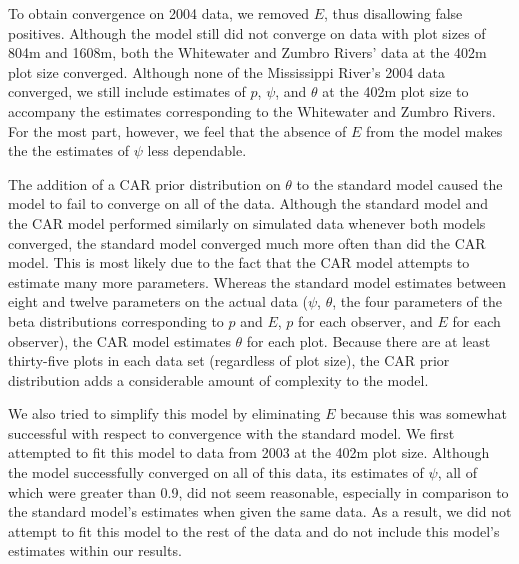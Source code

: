 \documentclass[12pt]{article}
\begin{document}
    To obtain convergence on 2004 data, we removed \(E\), thus disallowing false
    positives. Although the model still did not
    converge on data with plot sizes of 804m and 1608m, both the Whitewater and
    Zumbro Rivers' data at the 402m plot size converged. Although none of the
    Mississippi River's 2004 data converged, we still include estimates of
    \(p\), \(\psi\), and \(\theta\) at the 402m plot size to accompany the
    estimates corresponding to the Whitewater and Zumbro Rivers. For the most
    part, however, we feel that the absence of \(E\) from the model makes the
    the estimates of \(\psi\) less dependable.

    The addition of a CAR prior distribution on \(\theta\) to the standard model
    caused the model to fail to converge on all of the data. Although the
    standard model and the CAR model performed similarly on simulated data
    whenever both models converged, the standard model converged much more often
    than did the CAR model. This is most likely due to the fact that the CAR
    model attempts to estimate many more parameters. Whereas the standard model
    estimates between eight and twelve parameters on the actual data (\(\psi\),
    \(\theta\), the four parameters of the beta distributions corresponding to
    \(p\) and \(E\), \(p\) for each observer, and \(E\) for each observer), the
    CAR model estimates \(\theta\) for each plot. Because there are at least
    thirty-five plots in each data set (regardless of plot size), the CAR prior
    distribution adds a considerable amount of complexity to the model.

    We also tried to simplify this model by eliminating \(E\) because this was
    somewhat successful with respect to convergence with the standard model. We
    first attempted to fit this model to data from 2003 at the 402m plot size.
    Although the model successfully converged on all of this data, its estimates
    of \(\psi\), all of which were greater than 0.9, did not seem reasonable,
    especially in comparison to the standard model's estimates when given the
    same data. As a result, we did not attempt to fit this model to the rest of
    the data and do not include this model's estimates within our results.
\end{document}
